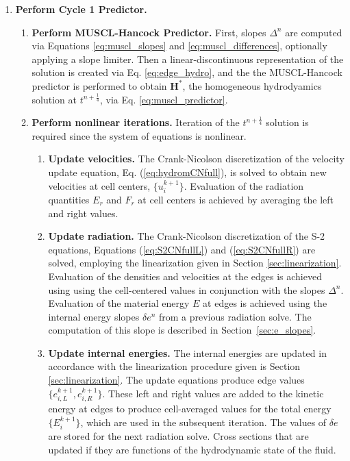 \documentclass[preprint,12pt]{elsarticle}
\newcommand{\requ}[1]{(\ref{eq:#1})}
\newcommand{\fourth}{\frac{1}{4}}
\newcommand{\E}{{E_r}}
\newcommand{\F}{{F_r}}
\renewcommand{\H}{\mathbf{H}}
\newcommand{\iL}{_{i,L}}
\newcommand{\iR}{_{i,R}}
\begin{document}
\begin{enumerate}





\item \textbf{Perform Cycle 1 Predictor.} 
\begin{enumerate}
\item \textbf{Perform MUSCL-Hancock Predictor.} First, slopes $\Delta^n$ are
computed via Equations \eqref{eq:muscl_slopes} and \eqref{eq:muscl_differences},
optionally applying a slope limiter.
Then a linear-discontinuous representation of the solution is created via
Eq. \eqref{eq:edge_hydro}, and the
the MUSCL-Hancock predictor is performed to obtain $\H^*$, the
homogeneous hydrodyamics solution at $t^{n+\fourth}$,
via Eq. \eqref{eq:muscl_predictor}.

\item \textbf{Perform nonlinear iterations.} Iteration of the
$t^{n+\fourth}$ solution is required since the system of equations
is nonlinear. 
\begin{enumerate}
\item\label{item:vel_update}
\textbf{Update velocities.} The Crank-Nicolson discretization
of the velocity update equation, Eq. \requ{hydromCNfull},
is solved to obtain new
velocities at cell centers, $\{u_i^{k+1}\}$. Evaluation of
the radiation quantities $\E$ and $\F$
at cell centers is achieved by averaging the left and right values.

\item \textbf{Update radiation.} The Crank-Nicolson discretization of the S-2
equations, Equations \requ{S2CNfullL} and \requ{S2CNfullR} are solved,
employing the linearization given in Section \ref{sec:linearization}.
Evaluation of the densities and velocities at the edges is achieved using using
the cell-centered values in conjunction with the slopes $\Delta^n$. Evaluation
of the material energy $E$ at edges is achieved using the internal energy
slopes $\delta e^n$ from a previous radiation solve.  The computation of this
slope is described in Section~\ref{sec:e_slopes}.

\item \textbf{Update internal energies.} The internal energies are
updated in accordance with the linearization procedure given is Section
\ref{sec:linearization}. The update equations produce edge values
$\{e^{k+1}\iL,e^{k+1}\iR\}$. These left and right values are added to the 
kinetic energy at edges to produce cell-averaged values for the total energy
$\{E^{k+1}_i\}$, which are used in the subsequent iteration.  The values
of $\delta e$ are stored for the next radiation solve.
Cross sections that are updated if they are functions of the hydrodynamic 
state of the fluid.


\end{enumerate}
\end{enumerate}
\end{enumerate}
\end{document}
